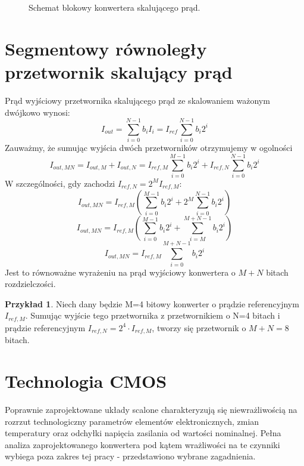 \documentclass[10pt,a4paper,twoside]{report}
\theoremstyle{definition}
\theoremstyle{definition}
\theoremstyle{definition}
\newtheorem{przyklad}{Przykład}[section]
\theoremstyle{definition}
\theoremstyle{definition}
\begin{document}
{\begin{figure}[!htb]
	\caption{Schemat blokowy konwertera skalującego prąd.}
	\label{currentscale}
\end{figure}

	\section{Segmentowy równoległy przetwornik skalujący prąd}
{	Prąd wyjściowy przetwornika skalującego prąd ze skalowaniem ważonym dwójkowo wynosi:
	\begin{equation}
	I_{out} = \sum_{i=0}^{N-1} b_i I_{i} = I_{ref} \sum_{i=0}^{N-1} b_i 2^{i}
	\end{equation}
	Zauważmy, że sumując wyjścia dwóch przetworników otrzymujemy w ogolności
	\begin{equation}
	I_{out,MN} = I_{out,M} + I_{out,N}
	= I_{ref,M} \sum_{i=0}^{M-1} b_i 2^{i} + I_{ref,N} \sum_{i=0}^{N-1} b_i 2^{i}
	\end{equation}
	W szczególności, gdy zachodzi $I_{ref,N} = 2^M I_{ref,M} $:
	\begin{equation}
	I_{out,MN} = I_{ref,M}\left(\sum_{i=0}^{M-1} b_i 2^{i} + 2^M \sum_{i=0}^{N-1} b_i 2^{i}\right) 
	\end{equation}
	\begin{equation}
	I_{out,MN} = I_{ref,M}\left(\sum_{i=0}^{M-1} b_i 2^{i} + \sum_{i=M}^{M+N-1} b_i 2^{i}\right) 
	\end{equation}
	\begin{equation}
	I_{out,MN} = I_{ref,M} \sum_{i=0}^{M+N-1} b_i 2^{i}
	\end{equation}
	Jest to równoważne wyrażeniu na prąd wyjściowy konwertera o $M+N$ bitach rozdzielczości.
	\begin{przyklad}{Niech dany będzie M=4 bitowy konwerter o prądzie referencyjnym $I_{ref,M}$. Sumując wyjście tego przetwornika z przetwornikiem o N=4 bitach i prądzie referencyjnym $ I_{ref,N} = 2^4 \cdot I_{ref,M} $, tworzy się przetwornik o $M+N=8$ bitach.}
	\end{przyklad}	
}

	\section{Technologia CMOS}
	{	Poprawnie zaprojektowane układy scalone charakteryzują się niewrażliwością na rozrzut technologiczny parametrów elementów elektronicznych, zmian temperatury oraz odchyłki napięcia zasilania od wartości nominalnej. Pełna analiza zaprojektowanego konwertera pod kątem wrażliwości na te czynniki wybiega poza zakres tej pracy - przedstawiono wybrane zagadnienia. }

}
\end{document}
